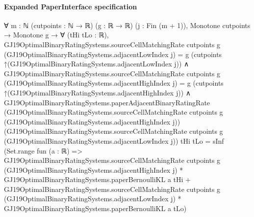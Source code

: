 \documentclass[10pt]{article}
\begin{document}
\paragraph{Expanded PaperInterface specification}
\begin{ReviewVerbatim}
∀ {m : ℕ} (cutpoints : ℕ → ℝ) (g : ℝ → ℝ) (j : Fin (m + 1)),
  Monotone cutpoints →
    Monotone g →
      ∀ (tHi tLo : ℝ),
        GJ19OptimalBinaryRatingSystems.sourceCellMatchingRate cutpoints g
              (GJ19OptimalBinaryRatingSystems.adjacentLowIndex j) =
            g (cutpoints ↑(GJ19OptimalBinaryRatingSystems.adjacentLowIndex j)) ∧
          GJ19OptimalBinaryRatingSystems.sourceCellMatchingRate cutpoints g
                (GJ19OptimalBinaryRatingSystems.adjacentHighIndex j) =
              g (cutpoints ↑(GJ19OptimalBinaryRatingSystems.adjacentHighIndex j)) ∧
            GJ19OptimalBinaryRatingSystems.paperAdjacentBinaryRatingRate
                (GJ19OptimalBinaryRatingSystems.sourceCellMatchingRate cutpoints g
                  (GJ19OptimalBinaryRatingSystems.adjacentHighIndex j))
                (GJ19OptimalBinaryRatingSystems.sourceCellMatchingRate cutpoints g
                  (GJ19OptimalBinaryRatingSystems.adjacentLowIndex j))
                tHi tLo =
              sInf
                (Set.range fun (a : ℝ) =>
                  GJ19OptimalBinaryRatingSystems.sourceCellMatchingRate cutpoints g
                        (GJ19OptimalBinaryRatingSystems.adjacentHighIndex j) *
                      GJ19OptimalBinaryRatingSystems.paperBernoulliKL a tHi +
                    GJ19OptimalBinaryRatingSystems.sourceCellMatchingRate cutpoints g
                        (GJ19OptimalBinaryRatingSystems.adjacentLowIndex j) *
                      GJ19OptimalBinaryRatingSystems.paperBernoulliKL a tLo)
\end{ReviewVerbatim}
\end{document}
